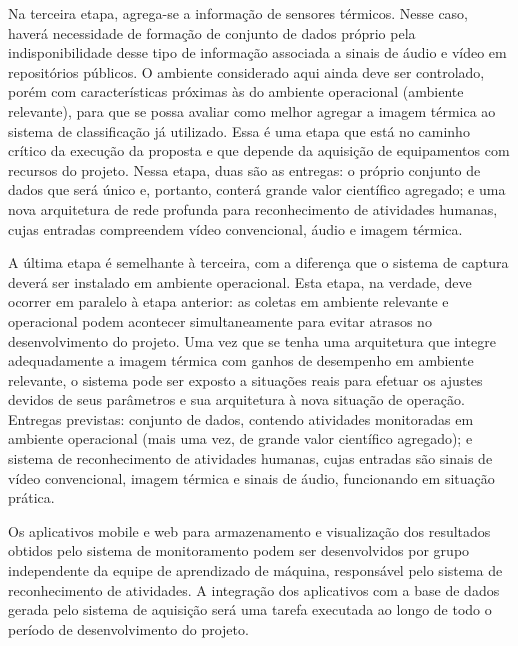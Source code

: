 Na terceira etapa, agrega-se a informação de sensores térmicos. Nesse caso, haverá necessidade de formação de conjunto de dados próprio pela indisponibilidade desse tipo de informação associada a sinais de áudio e vídeo em repositórios públicos. O ambiente considerado aqui ainda deve ser controlado, porém com características próximas às do ambiente operacional (ambiente relevante), para que se possa avaliar como melhor agregar a imagem térmica ao sistema de classificação já utilizado. Essa é uma etapa que está no caminho crítico da execução da proposta e que depende da aquisição de equipamentos com recursos do projeto. Nessa etapa, duas são as entregas: o próprio conjunto de dados que será único e, portanto, conterá grande valor científico agregado; e uma nova arquitetura de rede profunda para reconhecimento de atividades humanas, cujas entradas compreendem vídeo convencional, áudio e imagem térmica.

A última etapa é semelhante à terceira, com a diferença que o sistema de captura deverá ser instalado em ambiente operacional. Esta etapa, na verdade, deve ocorrer em paralelo à etapa anterior: as coletas em ambiente relevante e operacional podem acontecer simultaneamente para evitar atrasos no desenvolvimento do projeto. Uma vez que se tenha uma arquitetura que integre adequadamente a imagem térmica com ganhos de desempenho em ambiente relevante, o sistema pode ser exposto a situações reais para efetuar os ajustes devidos de seus parâmetros e sua arquitetura à nova situação de operação. Entregas previstas: conjunto de dados, contendo atividades monitoradas em ambiente operacional (mais uma vez, de grande valor científico agregado); e sistema de reconhecimento de atividades humanas, cujas entradas são sinais de vídeo convencional, imagem térmica e sinais de áudio, funcionando em situação prática.

Os aplicativos mobile e web para armazenamento e visualização dos resultados obtidos pelo sistema de monitoramento podem ser desenvolvidos por grupo independente da equipe de aprendizado de máquina, responsável pelo sistema de reconhecimento de atividades. A integração dos aplicativos com a base de dados gerada pelo sistema de aquisição será uma tarefa executada ao longo de todo o período de desenvolvimento do projeto.

